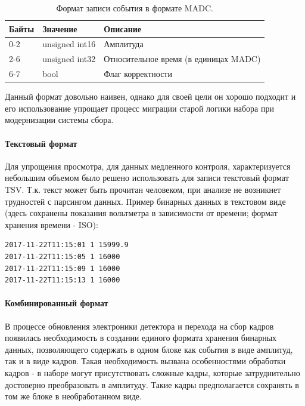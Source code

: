 \documentclass[a4paper,14pt]{extreport}
\begin{document}
\begin{table}
    \centering
    \begin{tabular}{|l|l|l|}
        \hline
        Байты & Значение & Описание \\
        \hline
        0-2 & unsigned int16 & Амплитуда \\
        \hline
        2-6 & unsigned int32 & Относительное время (в единицах MADC) \\
        \hline
        6-7 & bool & Флаг корректности \\
        \hline
    \end{tabular}
    \caption{Формат записи события в формате MADC.}
    \label{tab:madc-event-structure}
\end{table}

Данный формат довольно наивен, однако для своей цели он хорошо подходит и его использование упрощает процесс миграции старой логики набора при модернизации системы сбора.

\paragraph{Текстовый формат}
Для упрощения просмотра, для данных медленного контроля, характеризуется небольшим объемом было решено использовать для записи текстовый формат TSV. Т.к. текст может быть прочитан человеком, при анализе не возникнет трудностей с парсингом данных. Пример бинарных данных в текстовом виде (здесь сохранены показания вольтметра в зависимости от времени; формат хранения времени - ISO):

\begin{lstlisting}[caption={Пример данных, набираемых с вольтметра.}, captionpos=b]
2017-11-22T11:15:01 1 15999.9
2017-11-22T11:15:05 1 16000
2017-11-22T11:15:09 1 16000
2017-11-22T11:15:13 1 16000
\end{lstlisting}

\paragraph{Комбинированный формат}
В процессе обновления электроники детектора и перехода на сбор кадров появилась необходимость в создании единого формата хранения бинарных данных, позволяющего содержать в одном блоке как события в виде амплитуд, так и в виде кадров. Такая необходимость вызвана особенностями обработки кадров - в наборе могут присутствовать сложные кадры, которые затруднительно достоверно преобразовать в амплитуду. Такие кадры предполагается сохранять в том же блоке в необработанном виде.
\end{document}
